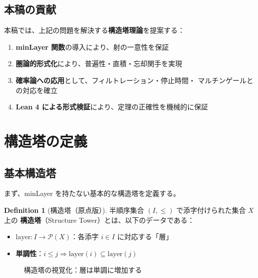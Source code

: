 \documentclass[11pt,a4paper]{article}
\theoremstyle{plain}
\theoremstyle{definition}
\newtheorem{definition}[theorem]{Definition}
\newcommand{\layer}{\mathrm{layer}}
\begin{document}
\subsection{本稿の貢献}

本稿では、上記の問題を解決する\textbf{構造塔理論}を提案する：

\begin{enumerate}[label=\textbf{(\roman*)}]
  \item \textbf{minLayer 関数}の導入により、射の一意性を保証
  \item \textbf{圏論的形式化}により、普遍性・直積・忘却関手を実現
  \item \textbf{確率論への応用}として、フィルトレーション・停止時間・
        マルチンゲールとの対応を確立
  \item \textbf{Lean 4 による形式検証}により、定理の正確性を機械的に保証
\end{enumerate}

\section{構造塔の定義}
\label{sec:definition}

\subsection{基本構造塔}

まず、minLayer を持たない基本的な構造塔を定義する。

\begin{definition}[構造塔（原点版）]
\label{def:structure-tower-basic}
半順序集合 $(I, \leq)$ で添字付けられた集合 $X$ 上の
\textbf{構造塔}（Structure Tower）とは、以下のデータである：
\begin{itemize}
  \item $\layer : I \to \mathcal{P}(X)$：各添字 $i \in I$ に対応する「層」
  \item \textbf{単調性}：$i \leq j \Rightarrow \layer(i) \subseteq \layer(j)$
\end{itemize}
\end{definition}

\begin{figure}[htbp]
\centering
{}
\caption{構造塔の視覚化：層は単調に増加する}
\label{fig:tower-basic}
\end{figure}
\end{document}
